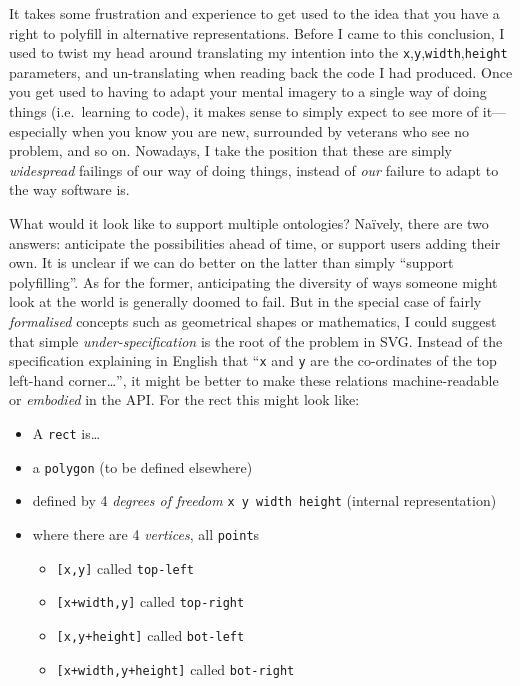 It takes some frustration and experience to get used to the idea that
you have a right to polyfill in alternative representations. Before I
came to this conclusion, I used to twist my head around translating my
intention into the
\texttt{x},\texttt{y},\texttt{width},\texttt{height}{} parameters, and
un-translating when reading back the code I had produced. Once you get
used to having to adapt your mental imagery to a single way of doing
things (i.e.~learning to code), it makes sense to simply expect to see
more of it---especially when you know you are new, surrounded by
veterans who see no problem, and so on. Nowadays, I take the position
that these are simply \emph{widespread} failings of our way of doing
things, instead of \emph{our} failure to adapt to the way software is.

What would it look like to support multiple ontologies? Naïvely, there
are two answers: anticipate the possibilities ahead of time, or support
users adding their own. It is unclear if we can do better on the latter
than simply ``support polyfilling''. As for the former, anticipating the
diversity of ways someone might look at the world is generally doomed to
fail. But in the special case of fairly \emph{formalised} concepts such
as geometrical shapes or mathematics, I could suggest that simple
\emph{under-specification} is the root of the problem in SVG. Instead of
the specification explaining in English that ``\texttt{x} and \texttt{y}
are the co-ordinates of the top left-hand corner\ldots{}'', it might be
better to make these relations machine-readable or \emph{embodied} in
the API. For the rect this might look like:

\begin{itemize}
\tightlist
\item
  A \texttt{rect} is\ldots{}
\item
  a \texttt{polygon} (to be defined elsewhere)
\item
  defined by 4 \emph{degrees of freedom} \texttt{x\ y\ width\ height}
  (internal representation)
\item
  where there are 4 \emph{vertices}, all \texttt{point}s

  \begin{itemize}
  \tightlist
  \item
    \texttt{{[}x,y{]}} called \texttt{top-left}
  \item
    \texttt{{[}x+width,y{]}} called \texttt{top-right}
  \item
    \texttt{{[}x,y+height{]}} called \texttt{bot-left}
  \item
    \texttt{{[}x+width,y+height{]}} called \texttt{bot-right}
  \end{itemize}
\end{itemize}

